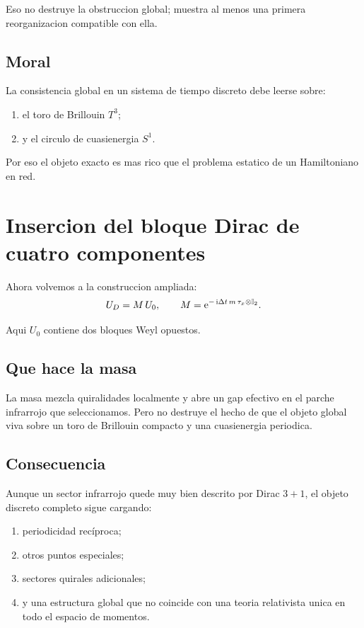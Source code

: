 Eso no destruye la obstruccion global; muestra al menos una primera reorganizacion compatible con ella.

\subsection{Moral}
La consistencia global en un sistema de tiempo discreto debe leerse sobre:
\begin{enumerate}[label=\arabic*.]
    \item el toro de Brillouin \(T^3\);
    \item y el circulo de cuasienergia \(S^1\).
\end{enumerate}

Por eso el objeto exacto es mas rico que el problema estatico de un Hamiltoniano en red.

\section{Insercion del bloque Dirac de cuatro componentes}
Ahora volvemos a la construccion ampliada:
\begin{equation}
U_D = M\,U_0,
\qquad
M=\mathrm{e}^{-\,\mathrm{i} \Delta t\,m\,\tau_x\otimes\mathbb{I}_2}.
\label{c32:eq:UD}
\end{equation}

Aqui \(U_0\) contiene dos bloques Weyl opuestos.

\subsection{Que hace la masa}
La masa mezcla quiralidades localmente y abre un gap efectivo en el parche infrarrojo que seleccionamos. Pero no destruye el hecho de que el objeto global viva sobre un toro de Brillouin compacto y una cuasienergia periodica.

\subsection{Consecuencia}
Aunque un sector infrarrojo quede muy bien descrito por Dirac \(3+1\), el objeto discreto completo sigue cargando:
\begin{enumerate}[label=\arabic*.]
    \item periodicidad recíproca;
    \item otros puntos especiales;
    \item sectores quirales adicionales;
    \item y una estructura global que no coincide con una teoria relativista unica en todo el espacio de momentos.
\end{enumerate}

